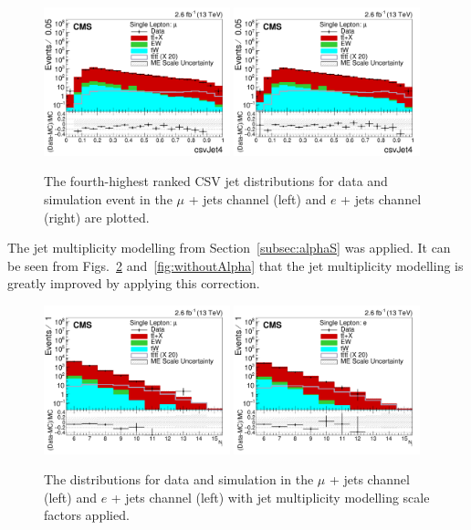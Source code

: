 \begin{figure}[ht!]
    \includegraphics[width=0.48\textwidth]{images/Run2/csvJet4_StackLogY_noSF.pdf}
    \includegraphics[width=0.48\textwidth]{images/Run2/csvJet4_StackLogY.pdf}
    \caption{ The fourth-highest ranked CSV jet distributions for data and simulation event in the $\mu$ + jets channel (left) and $e$ + jets channel (right) are plotted.}
    \label{fig:csvJet4SF}
\end{figure}
 

The jet multiplicity modelling from Section~\ref{subsec:alphaS} was applied. It can be seen from Figs.~\ref{fig:withAlpha} and~\ref{fig:withoutAlpha} that the jet multiplicity modelling is greatly improved by applying this correction.

\begin{figure}[ht!]
    \includegraphics[width=0.48\textwidth]{images/Run2/nJets_StackLogY.pdf}
    \includegraphics[width=0.48\textwidth]{images/Run2/nJets_StackLogY_e.pdf}
    \caption{The \njets distributions for data and simulation in the $\mu$ + jets channel (left) and $e$ + jets channel (left) with jet multiplicity modelling scale factors applied.}
    \label{fig:withAlpha}
\end{figure}

